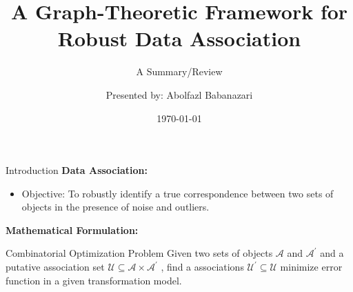 \documentclass{beamer}
\title[CLIPPER]{A Graph-Theoretic Framework for Robust Data Association}
\subtitle{A Summary/Review}
\author{Presented by: Abolfazl Babanazari}
\date{\today}
\begin{document}
\begin{frame}
  \titlepage
\end{frame}

\begin{frame}{Introduction}
  \textbf{Data Association:}
  \begin{itemize}
    \item Objective: To robustly identify a true correspondence between two sets of objects in the presence of noise and outliers.
  \end{itemize}

  \textbf{Mathematical Formulation:}
  \begin{block}{Combinatorial Optimization Problem}
    Given two sets of objects \( \mathcal{A} \) and \( \mathcal{A^\prime} \) and a putative association set \( \mathcal{U} \subseteq \mathcal{A}
    \times \mathcal{A^\prime} \) , find a associations \( \mathcal{U}^\prime \subseteq \mathcal{U} \) minimize error function in a given transformation model.
  \end{block}\
\end{frame}
\end{document}
